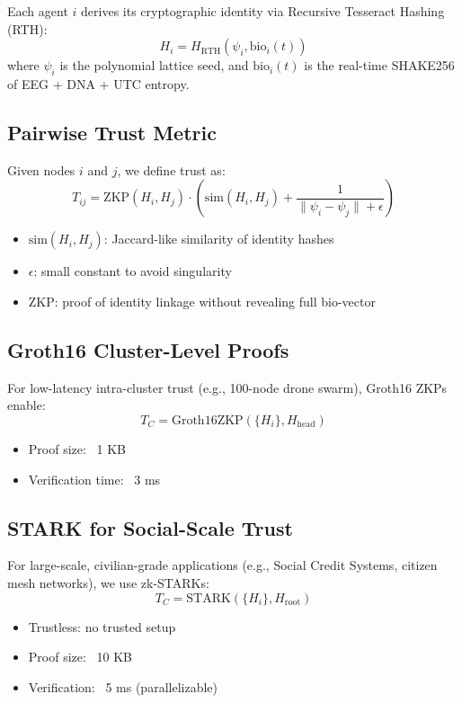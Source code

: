 \documentclass[12pt]{article}
\begin{document}
Each agent \( i \) derives its cryptographic identity via Recursive Tesseract Hashing (RTH):
\[
H_i = H_{\text{RTH}}(\psi_i, \text{bio}_i(t))
\]
where \( \psi_i \) is the polynomial lattice seed, and \( \text{bio}_i(t) \) is the real-time SHAKE256 of EEG + DNA + UTC entropy.

\subsection*{Pairwise Trust Metric}

Given nodes \( i \) and \( j \), we define trust as:
\[
T_{ij} = \text{ZKP}(H_i, H_j) \cdot \left( \text{sim}(H_i, H_j) + \frac{1}{\|\psi_i - \psi_j\| + \epsilon} \right)
\]
\begin{itemize}
    \item \( \text{sim}(H_i, H_j) \): Jaccard-like similarity of identity hashes
    \item \( \epsilon \): small constant to avoid singularity
    \item \( \text{ZKP} \): proof of identity linkage without revealing full bio-vector
\end{itemize}

\subsection*{Groth16 Cluster-Level Proofs}

For low-latency intra-cluster trust (e.g., 100-node drone swarm), Groth16 ZKPs enable:
\[
T_C = \text{Groth16ZKP}(\{H_i\}, H_{\text{head}})
\]
\begin{itemize}
    \item Proof size: ~1 KB
    \item Verification time: ~3 ms
\end{itemize}

\subsection*{STARK for Social-Scale Trust}

For large-scale, civilian-grade applications (e.g., Social Credit Systems, citizen mesh networks), we use zk-STARKs:
\[
T_C = \text{STARK}(\{H_i\}, H_{\text{root}})
\]
\begin{itemize}
    \item Trustless: no trusted setup
    \item Proof size: ~10 KB
    \item Verification: ~5 ms (parallelizable)
\end{itemize}
\end{document}
